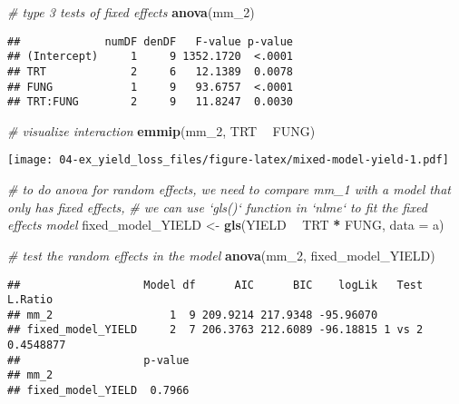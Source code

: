 \documentclass[]{book}
\newenvironment{Shaded}{\begin{snugshade}}{\end{snugshade}}
\newcommand{\CommentTok}[1]{\textcolor[rgb]{0.56,0.35,0.01}{\textit{#1}}}
\newcommand{\DataTypeTok}[1]{\textcolor[rgb]{0.13,0.29,0.53}{#1}}
\newcommand{\DecValTok}[1]{\textcolor[rgb]{0.00,0.00,0.81}{#1}}
\newcommand{\KeywordTok}[1]{\textcolor[rgb]{0.13,0.29,0.53}{\textbf{#1}}}
\newcommand{\NormalTok}[1]{#1}
\newcommand{\OperatorTok}[1]{\textcolor[rgb]{0.81,0.36,0.00}{\textbf{#1}}}
\newcommand{\StringTok}[1]{\textcolor[rgb]{0.31,0.60,0.02}{#1}}
\begin{document}
\begin{Shaded}
\begin{Highlighting}[]
\CommentTok{# type 3 tests of fixed effects}
\KeywordTok{anova}\NormalTok{(mm_}\DecValTok{2}\NormalTok{)}
\end{Highlighting}
\end{Shaded}

\begin{verbatim}
##             numDF denDF   F-value p-value
## (Intercept)     1     9 1352.1720  <.0001
## TRT             2     6   12.1389  0.0078
## FUNG            1     9   93.6757  <.0001
## TRT:FUNG        2     9   11.8247  0.0030
\end{verbatim}

\begin{Shaded}
\begin{Highlighting}[]
\CommentTok{# visualize interaction}
\KeywordTok{emmip}\NormalTok{(mm_}\DecValTok{2}\NormalTok{, TRT }\OperatorTok{~}\StringTok{ }\NormalTok{FUNG)}
\end{Highlighting}
\end{Shaded}

\texttt{[image: 04-ex\_yield\_loss\_files/figure-latex/mixed-model-yield-1.pdf]}

\begin{Shaded}
\begin{Highlighting}[]
\CommentTok{# to do anova for random effects, we need to compare mm_1 with a model that only has fixed effects,}
\CommentTok{# we can use `gls()` function in `nlme` to fit the fixed effects model}
\NormalTok{fixed_model_YIELD <-}\StringTok{ }\KeywordTok{gls}\NormalTok{(YIELD }\OperatorTok{~}\StringTok{ }\NormalTok{TRT }\OperatorTok{*}\StringTok{ }\NormalTok{FUNG,}
                                     \DataTypeTok{data =}\NormalTok{ a)}

\CommentTok{# test the random effects in the model}
\KeywordTok{anova}\NormalTok{(mm_}\DecValTok{2}\NormalTok{, fixed_model_YIELD)}
\end{Highlighting}
\end{Shaded}

\begin{verbatim}
##                   Model df      AIC      BIC    logLik   Test   L.Ratio
## mm_2                  1  9 209.9214 217.9348 -95.96070                 
## fixed_model_YIELD     2  7 206.3763 212.6089 -96.18815 1 vs 2 0.4548877
##                   p-value
## mm_2                     
## fixed_model_YIELD  0.7966
\end{verbatim}
\end{document}
